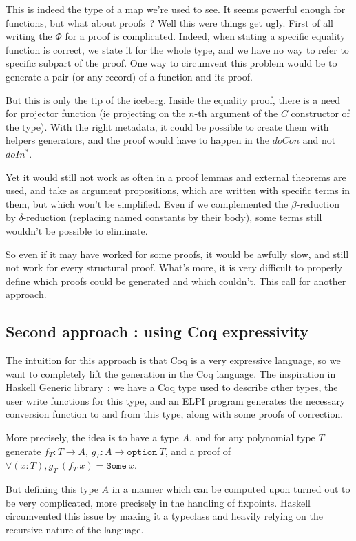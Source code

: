 \documentclass{article}
\begin{document}
This is indeed the type of a map we're used to see. It seems powerful enough for
functions, but what about proofs~? Well this were things get ugly. First of
all writing the $\Phi$ for a proof is complicated. Indeed, when stating a specific
equality function is correct, we state it for the whole type, and we have no
way to refer to specific subpart of the proof. One way to circumvent this problem
would be to generate a pair (or any record) of a function and its proof.

But this is only the tip of the iceberg. Inside the equality proof, there is
a need for projector function (ie projecting on the $n$-th argument of the $C$
constructor of the type). With the right metadata, it could be possible to create
them with helpers generators, and the proof would have to happen in the
$doCon$ and not $doIn^*$.

Yet it would still not work as often in a proof lemmas and external theorems
are used, and take as argument propositions, which are written with specific
terms in them, but which won't be simplified. Even if we complemented the
$\beta$-reduction by $\delta$-reduction (replacing named constants by their
body), some terms still wouldn't be possible to eliminate.

So even if it may have worked for some proofs, it would be awfully slow, and still
not work for every structural proof. What's more, it is very difficult to
properly define which proofs could be generated and which couldn't. This call
for another approach.

\subsection{Second approach : using Coq expressivity}

The intuition for this approach is that Coq is a very expressive language, so
we want to completely lift the generation in the Coq language. The inspiration
in Haskell Generic library~: we have a Coq type used to describe other types,
the user write functions for this type, and an ELPI program generates the
necessary conversion function to and from this type, along with some proofs
of correction.

More precisely, the idea is to have a type $A$, and for any polynomial type $T$
generate $f_T : T \rightarrow A$, $g_T : A \rightarrow\mathtt{option}\ T$, and
a proof of $\forall (x : T), g_T\ (f_T\ x) = \mathtt{Some}\ x$.

But defining this type $A$ in a manner which can be computed upon turned out
to be very complicated, more precisely in the handling of fixpoints. Haskell
circumvented this issue by making it a typeclass and heavily relying on the
recursive nature of the language.
\end{document}
